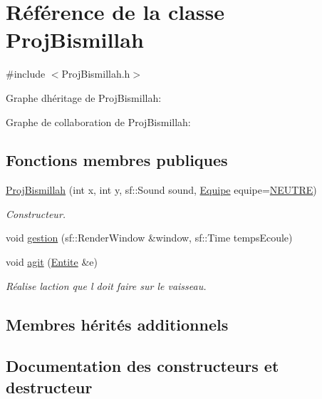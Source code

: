 \hypertarget{class_proj_bismillah}{}\section{Référence de la classe Proj\+Bismillah}
\label{class_proj_bismillah}


{\ttfamily \#include $<$Proj\+Bismillah.\+h$>$}



Graphe d\textquotesingle{}héritage de Proj\+Bismillah\+:


Graphe de collaboration de Proj\+Bismillah\+:
\subsection*{Fonctions membres publiques}
\begin{DoxyCompactItemize}
\item 
\hyperlink{class_proj_bismillah_a6a26d25b463a7ae0298abf31085ff7c3}{Proj\+Bismillah} (int x, int y, sf\+::\+Sound sound, \hyperlink{constantes_8h_a08fa5554288d5031a8f3bb83cc04ee83}{Equipe} equipe=\hyperlink{constantes_8h_a08fa5554288d5031a8f3bb83cc04ee83a31ad00d2974deb1103ea000de3bff57d}{N\+E\+U\+T\+RE})
\begin{DoxyCompactList}\small\item\em Constructeur. \end{DoxyCompactList}\item 
void \hyperlink{class_proj_bismillah_a6db489d8ffa3986d073518cf79416c98}{gestion} (sf\+::\+Render\+Window \&window, sf\+::\+Time temps\+Ecoule)
\item 
void \hyperlink{class_proj_bismillah_a23bdc7268920f71d218198ae26021a4f}{agit} (\hyperlink{class_entite}{Entite} \&e)
\begin{DoxyCompactList}\small\item\em Réalise l\textquotesingle{}action que l doit faire sur le vaisseau. \end{DoxyCompactList}\end{DoxyCompactItemize}
\subsection*{Membres hérités additionnels}


\subsection{Documentation des constructeurs et destructeur}
\mbox{\label{class_proj_bismillah_a6a26d25b463a7ae0298abf31085ff7c3}} 
